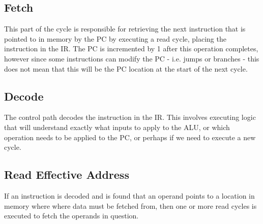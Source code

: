 \documentclass[10pt,a4paper]{article}
\begin{document}
\subsection{Fetch}
This part of the cycle is responsible for retrieving the next instruction that is pointed to in memory by the PC by executing a read cycle, placing the instruction in the IR. The PC is incremented by 1 after this operation completes, however since some instructions can modify the PC - i.e. jumps or branches - this does not mean that this will be the PC location at the start of the next cycle.   
\subsection{Decode}
The control path decodes the instruction in the IR. This involves executing logic that will understand exactly what inputs to apply to the ALU, or which operation needs to be applied to the PC, or perhaps if we need to execute a new cycle. 
\subsection{Read Effective Address}
If an instruction is decoded and is found that an operand points to a location in memory where where data must be fetched from, then one or more read cycles is executed to fetch the operands in question. 
\end{document}
